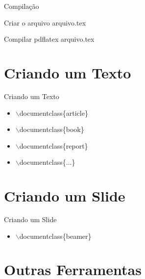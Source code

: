 \documentclass{beamer}
\begin{document}
\begin{frame}{Compilação}
	
	\begin{itemize}
		\begin{block}{Criar o arquivo}
			arquivo.tex
		\end{block}
	
		\begin{block}{Compilar}
			pdflatex arquivo.tex
		\end{block}
		
	\end{itemize}

\end{frame}




\section{Criando um Texto}
\begin{frame}{Criando um Texto}

	\begin{itemize}
		\item $\backslash$documentclass\{article\}
		\item $\backslash$documentclass\{book\}
		\item $\backslash$documentclass\{report\}
		\item $\backslash$documentclass\{...\}
	\end{itemize}
	

\end{frame}


\section{Criando um Slide}

	\begin{frame}{Criando um Slide}
	
	\begin{itemize}
		\item $\backslash$documentclass\{beamer\}
	\end{itemize}

\end{frame}

\section{Outras Ferramentas}
\end{document}
